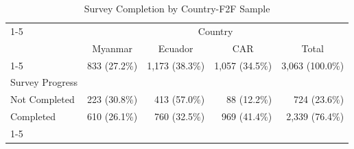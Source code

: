\begin{table}[!h]
\caption{Survey Completion by Country-F2F Sample}
\centering
\begin{tabular}{lllll}
\cline{1-5}
\multicolumn{1}{r}{} &
  \multicolumn{4}{c}{Country} \\
\multicolumn{1}{r}{} &
  \multicolumn{1}{c}{Myanmar} &
  \multicolumn{1}{c}{Ecuador} &
  \multicolumn{1}{c}{CAR} &
  \multicolumn{1}{c}{Total} \\
\cline{1-5}
\multicolumn{1}{l}{N} &
  \multicolumn{1}{r}{833 (27.2\%)} &
  \multicolumn{1}{r}{1,173 (38.3\%)} &
  \multicolumn{1}{r}{1,057 (34.5\%)} &
  \multicolumn{1}{r}{3,063 (100.0\%)} \\
\multicolumn{1}{l}{Survey Progress} &
  \multicolumn{1}{r}{} &
  \multicolumn{1}{r}{} &
  \multicolumn{1}{r}{} &
  \multicolumn{1}{r}{} \\
\multicolumn{1}{l}{\hspace{1em}Not Completed} &
  \multicolumn{1}{r}{223 (30.8\%)} &
  \multicolumn{1}{r}{413 (57.0\%)} &
  \multicolumn{1}{r}{88 (12.2\%)} &
  \multicolumn{1}{r}{724 (23.6\%)} \\
\multicolumn{1}{l}{\hspace{1em}Completed} &
  \multicolumn{1}{r}{610 (26.1\%)} &
  \multicolumn{1}{r}{760 (32.5\%)} &
  \multicolumn{1}{r}{969 (41.4\%)} &
  \multicolumn{1}{r}{2,339 (76.4\%)} \\
\cline{1-5}
\end{tabular}
\end{table}
